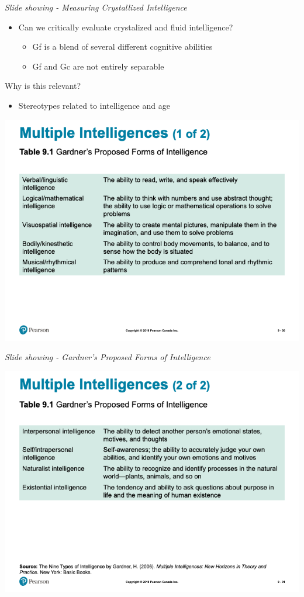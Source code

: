\documentclass[
]{book}
\providecommand{\tightlist}{%
  \setlength{\itemsep}{0pt}\setlength{\parskip}{0pt}}
\begin{document}
\begin{reflect}
\emph{Slide showing - Measuring Crystallized Intelligence}

\begin{itemize}
\tightlist
\item
  Can we critically evaluate crystalized and fluid intelligence?

  \begin{itemize}
  \tightlist
  \item
    Gf is a blend of several different cognitive abilities\\
  \item
    Gf and Gc are not entirely separable
  \end{itemize}
\end{itemize}

Why is this relevant?

\begin{itemize}
\tightlist
\item
  Stereotypes related to intelligence and age
\end{itemize}

\includegraphics{assets/unit_2/slide_30.png}

\emph{Slide showing - Gardner's Proposed Forms of Intelligence}

\includegraphics{assets/unit_2/slide_31.png}


\end{reflect}
\end{document}
